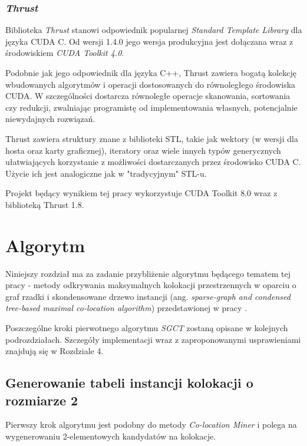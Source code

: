 \documentclass[12pt]{article}
\begin{document}
\subsubsection{\textit{Thrust}}

Biblioteka \textit{Thrust} stanowi odpowiednik popularnej \textit{Standard Template Library} dla języka CUDA C. Od wersji 1.4.0 jego wersja produkcyjna jest dołączana wraz z środowiskiem \textit{CUDA Toolkit 4.0}.

Podobnie jak jego odpowiednik dla języka C++, Thrust zawiera bogatą kolekcję wbudowanych algorytmów i operacji dostosowanych do równoległego środowiska CUDA. W szczególności dostarcza równoległe operacje skanowania, sortowania czy redukcji, zwalniając programistę od implementowania własnych, potencjalnie niewydajnych rozwiązań.

Thrust zawiera struktury znane z biblioteki STL, takie jak wektory (w wersji dla hosta oraz karty graficznej), iteratory oraz wiele innych typów generycznych ułatwiających korzystanie z możliwości dostarczanych przez środowisko CUDA C. Użycie ich jest analogiczne jak w "tradycyjnym" STL-u.

Projekt będący wynikiem tej pracy wykorzystuje CUDA Toolkit 8.0 wraz z biblioteką Thrust 1.8.

\newpage

\section{Algorytm}

Niniejszy rozdział ma za zadanie przybliżenie algorytmu będącego tematem tej pracy - metody odkrywania maksymalnych kolokacji przestrzennych w oparciu o graf rzadki i skondensowane drzewo instancji (ang. \textit{sparse-graph and condensed tree-based maximal co-location algorithm}) przedstawionej w pracy \cite{chinczyki}. 

Poszczególne kroki pierwotnego algorytmu \textit{SGCT} zostaną opisane w kolejnych podrozdziałach. Szczegóły implementacji wraz z zaproponowanymi usprawieniami znajdują się w Rozdziale 4.

\subsection{Generowanie tabeli instancji kolokacji o rozmiarze 2}

Pierwszy krok algorytmu jest podobny do metody \textit{Co-location Miner} i polega na wygenerowaniu 2-elementowych kandydatów na kolokacje. 
\end{document}

